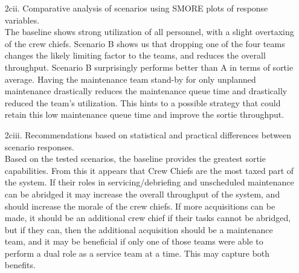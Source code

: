 \documentclass[answers]{exam}
\begin{document}
\begin{questions}
\begin{enumerate}
\begin{solution}
\begin{enumerate}
		\item[2cii.] Comparative analysis of scenarios using SMORE plots of response variables.\\
			The baseline shows strong utilization of all personnel, 
			with a slight overtaxing of the crew chiefs.
			Scenario B shows us that dropping one of the four teams
			changes the likely limiting factor to the teams, and reduces the overall throughput.
			Scenario B surprisingly performs better than A in terms of sortie average.
			Having the maintenance team stand-by for only unplanned maintenance drastically 
			reduces the maintenance queue time and drastically reduced the team's utilization.
			This hints to a possible strategy that could retain this low maintenance
			queue time and improve the sortie throughput.
		
		\item[2ciii.] Recommendations based on statistical and practical differences between scenario responses. \\
			Based on the tested scenarios, the baseline provides the greatest sortie capabilities.
			From this it appears that Crew Chiefs are the most taxed part of the system.
			If their roles in servicing/debriefing and unscheduled maintenance can be abridged
			it may increase the overall throughput of the system, and should increase the morale
			of the crew chiefs.
			If more acquisitions can be made, it should be an additional crew chief if their tasks
			cannot be abridged, but if they can, then the additional acquisition should be a maintenance
			team, and it may be beneficial if only one of those teams were
			able to perform a dual role as a service team at a time.
			This may capture both benefits.
		
	\end{enumerate}	
	\end{solution}
\end{enumerate}


\end{questions}
\end{document}
